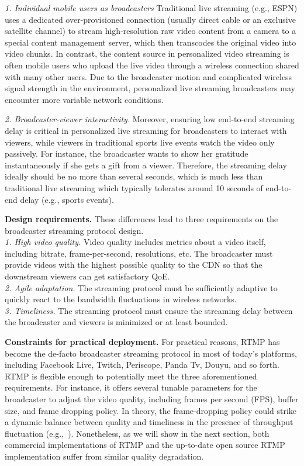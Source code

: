 {\em 1. Individual mobile users as broadcasters}
Traditional live streaming (e.g., ESPN) uses a dedicated
over-provisioned connection (usually direct cable or an exclusive
satellite channel) to stream high-resolution raw video
content from a camera to a special content management
server, which then transcodes the original video into video chunks.
In contrast, the content source in personalized video
streaming is often mobile users who upload the live video
through a wireless connection shared with many other users. Due to the broadcaster motion and complicated wireless signal strength in the environment, personalized live streaming broadcasters may encounter more variable network conditions.

{\em 2. Broadcaster-viewer interactivity.}
Moreover, ensuring low end-to-end streaming delay is critical
in personalized live streaming for broadcasters
to interact with viewers, while viewers in traditional sports live
events watch the video only passively.
For instance, the broadcaster wants to show her gratitude
instantaneously if she gets a gift from a viewer.
Therefore, the streaming delay ideally should be no more than
several seconds, which is much less than traditional live
streaming which typically tolerates around 10 seconds of end-to-end
delay (e.g., sports events).

\textbf{Design requirements.} These differences lead to three requirements on the broadcaster streaming protocol design.\\
{\em 1. High video quality.} Video quality includes metrics about a video itself, including bitrate, frame-per-second, resolutions, etc. The broadcaster must provide videos with the highest possible quality to the CDN so that the downstream viewers can get satisfactory QoE.\\
{\em 2. Agile adaptation.} The streaming protocol must be sufficiently adaptive to quickly react to the bandwidth fluctuations in wireless networks.\\
{\em 3. Timeliness.} The streaming protocol must ensure the streaming delay between the broadcaster and viewers is minimized
or at least bounded.

\textbf{Constraints for practical deployment.}
For practical reasons, RTMP has become the de-facto
broadcaster streaming protocol in most of today's platforms,
including Facebook Live, Twitch, Periscope, Panda Tv,
Douyu, and so forth.
RTMP is flexible enough to potentially meet
the three aforementioned requirements.
For instance, it offers several tunable parameters for
the broadcaster to adjust the video quality, including
frames per second (FPS), buffer size, and frame dropping
policy.
In theory, the frame-dropping policy could
strike a dynamic balance between quality and timeliness
in the presence of throughput fluctuation
(e.g.,~\cite{huang2003adaptive,krasic2003quality,singh2004dynamic}).
Nonetheless, as we will show in the next section,
both commercial implementations of RTMP and
the up-to-date open source RTMP implementation suffer from similar quality degradation.


